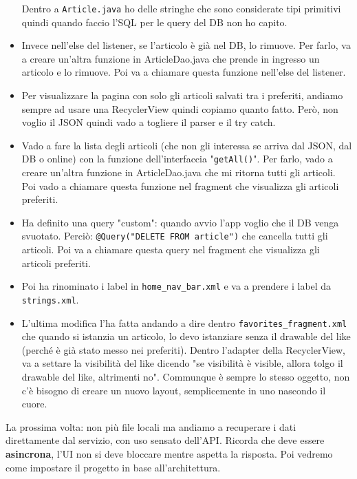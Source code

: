 \begin{itemize}
    Dentro a \texttt{Article.java} ho delle stringhe che sono considerate tipi primitivi quindi quando faccio l'SQL per le query del DB non ho capito.
    \item Invece nell'else del listener, se l'articolo è già nel DB, lo rimuove. Per farlo, va a creare un'altra funzione in ArticleDao.java che prende in ingresso un articolo e lo rimuove. Poi va a chiamare questa funzione nell'else del listener.
    \item Per visualizzare la pagina con solo gli articoli salvati tra i preferiti, andiamo sempre ad usare una RecyclerView quindi copiamo quanto fatto. Però, non voglio il JSON quindi vado a togliere il parser e il try catch.
    \item Vado a fare la lista degli articoli (che non gli interessa se arriva dal JSON, dal DB o online) con la funzione dell'interfaccia "\texttt{getAll()}". Per farlo, vado a creare un'altra funzione in ArticleDao.java che mi ritorna tutti gli articoli. Poi vado a chiamare questa funzione nel fragment che visualizza gli articoli preferiti.
    \item Ha definito una query "custom": quando avvio l'app voglio che il DB venga svuotato. Perciò: \texttt{@Query("DELETE FROM article")} che cancella tutti gli articoli. Poi va a chiamare questa query nel fragment che visualizza gli articoli preferiti.
    \item Poi ha rinominato i label in \texttt{home\_nav\_bar.xml} e va a prendere i label da \texttt{strings.xml}.
    \item L'ultima modifica l'ha fatta andando a dire dentro \texttt{favorites\_fragment.xml} che quando si istanzia un articolo, lo devo istanziare senza il drawable del like (perché è già stato messo nei preferiti). Dentro l'adapter della RecyclerView, va a settare la visibilità del like dicendo "se visibilità è visible, allora tolgo il drawable del like, altrimenti no". Communque è sempre lo stesso oggetto, non c'è bisogno di creare un nuovo layout, semplicemente in uno nascondo il cuore.
\end{itemize}
\par La prossima volta: non più file locali ma andiamo a recuperare i dati direttamente dal servizio, con uso sensato dell'API. Ricorda che deve essere \textbf{asincrona}, l'UI non si deve bloccare mentre aspetta la risposta. Poi vedremo come impostare il progetto in base all'architettura.